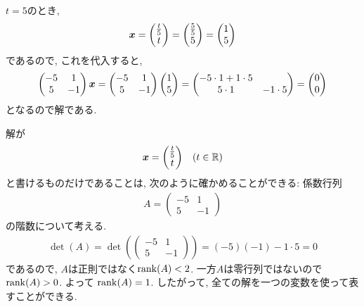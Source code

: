 \begin{checkanswer}
  $t=5$のとき,
  \begin{align*}
    \boldsymbol{x}=\begin{pmatrix}\frac{t}{5}\\t\end{pmatrix}=\begin{pmatrix}\frac{5}{5}\\5\end{pmatrix}=\begin{pmatrix}1\\5\end{pmatrix}
  \end{align*}
  であるので, これを代入すると,
  \begin{align*}
    \begin{pmatrix}-5&1\\5&-1\end{pmatrix}\boldsymbol{x}
     =
    \begin{pmatrix}-5&1\\5&-1\end{pmatrix}\begin{pmatrix}1\\5\end{pmatrix}
     =
    \begin{pmatrix}-5\cdot 1+1\cdot 5\\5\cdot 1&-1\cdot 5\end{pmatrix}
     =
    \begin{pmatrix}0\\0\end{pmatrix}
  \end{align*}
  となるので解である.
\end{checkanswer}
\begin{checkanswer}%
  解が
  \begin{align*}
    \boldsymbol{x}=\begin{pmatrix}\frac{t}{5}\\t\end{pmatrix} && (t\in\mathbb{R})
  \end{align*}
  と書けるものだけであることは,
  次のように確かめることができる:
  係数行列
  \begin{align*}
    A=\begin{pmatrix}-5&1\\5&-1\end{pmatrix}
  \end{align*}
  の階数について考える.
  \begin{align*}
    \det(A)=\det(\begin{pmatrix}-5&1\\5&-1\end{pmatrix})
      =(-5)(-1)-1\cdot 5=0
  \end{align*}
  であるので, $A$は正則ではなく$\operatorname{rank}(A)<2$.
  一方$A$は零行列ではないので$\operatorname{rank}(A)>0$.
  よって
  $\operatorname{rank}(A)=1$.
  したがって, 全ての解を一つの変数を使って表すことができる.
\end{checkanswer}

